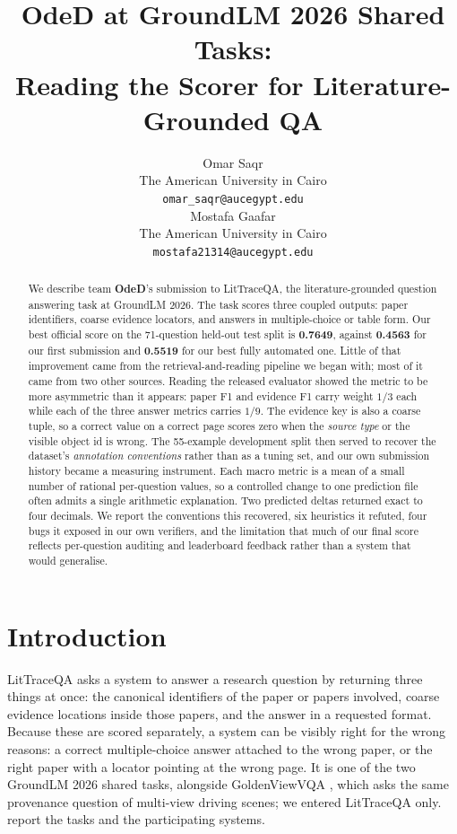 \documentclass[11pt]{article}
\title{OdeD at GroundLM 2026 Shared Tasks:\\
Reading the Scorer for Literature-Grounded QA}
\author{Omar Saqr \\
  The American University in Cairo \\
  \texttt{omar\_saqr@aucegypt.edu} \\\And
  Mostafa Gaafar \\
  The American University in Cairo \\
  \texttt{mostafa21314@aucegypt.edu}}
\begin{document}
\maketitle

\begin{abstract}
We describe team \textbf{OdeD}'s submission to LitTraceQA, the
literature-grounded question answering task at GroundLM 2026. The task scores
three coupled outputs: paper identifiers, coarse evidence locators, and answers
in multiple-choice or table form. Our best official score on the 71-question
held-out test split is \textbf{0.7649}, against \textbf{0.4563} for our first
submission and \textbf{0.5519} for our best fully automated one. Little of that
improvement came from the retrieval-and-reading pipeline we began with; most of
it came from two other sources. Reading the released evaluator showed the metric
to be more asymmetric than it appears: paper F1 and evidence F1 carry weight
$1/3$ each while each of the three answer metrics carries $1/9$. The evidence key
is also a coarse tuple, so a correct value on a correct page scores zero when the
\emph{source type} or the visible object id is wrong. The 55-example development split then served to recover the dataset's
\emph{annotation conventions} rather than as a tuning set, and our own submission
history became a measuring instrument. Each macro metric is a mean of a small
number of rational per-question values, so a controlled change to one prediction
file often admits a single arithmetic explanation. Two predicted deltas returned exact to four
decimals. We report the conventions this recovered, six heuristics it refuted,
four bugs it exposed in our own verifiers, and the limitation that much of our
final score reflects per-question auditing and leaderboard feedback rather than a
system that would generalise.
\end{abstract}

\section{Introduction}

LitTraceQA \citep{liu2026littraceqabenchmarkmultistagegrounding} asks a system to
answer a research question by returning three things at once: the canonical
identifiers of the paper or papers involved, coarse evidence locations inside
those papers, and the answer in a requested format. Because these are scored
separately, a system can be visibly right for the wrong reasons: a correct
multiple-choice answer attached to the wrong paper, or the right paper with a
locator pointing at the wrong page. It is one of the two GroundLM 2026 shared
tasks, alongside GoldenViewVQA \citep{wang2026doesanswercomefrom}, which asks the
same provenance question of multi-view driving scenes; we entered LitTraceQA
only. \citet{wang-etal-2026-groundlm} report the tasks and the participating
systems.
\end{document}
